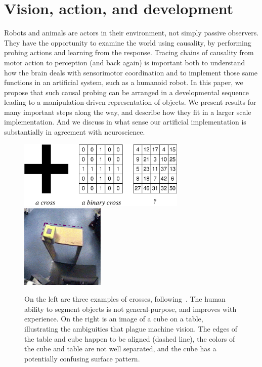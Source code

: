 
\section{Vision, action, and development}

Robots and animals are actors in their environment, not simply passive
observers.  They have the opportunity to examine the world using
causality, by performing probing actions and learning from the
response.  
Tracing chains of causality from motor action to perception
(and back again) is important both to understand how the brain deals
with sensorimotor coordination and to implement those same functions
in an artificial system, such as a humanoid robot.
In this paper, we propose that such causal probing can be arranged in
a developmental sequence leading to a manipulation-driven
representation of objects.  We present results for many important steps
along the way, and describe how they fit in a larger scale implementation.
And we discuss in what sense our artificial implementation is substantially 
in agreement with neuroscience. 


%
\begin{figure}[tb]
\begin{center}
\includegraphics[width=8.0cm]{number-cross.eps}
\hspace{2cm}
\includegraphics[width=4cm]{setup-sequence.eps}
\caption{ 
\label{fig:number-cross}
%
On the left are three examples of crosses,
following~\cite{manzotti01coscienza}.  The human ability to segment
objects is not general-purpose, and improves with experience.
On the right is an image of a cube on a table, illustrating the
ambiguities that plague machine vision. 
The edges of the table and cube happen to be
aligned (dashed line), the colors of the cube and table are not well
separated, and the cube has a potentially confusing surface pattern.
%
}
\end{center}
\end{figure}
%
%


